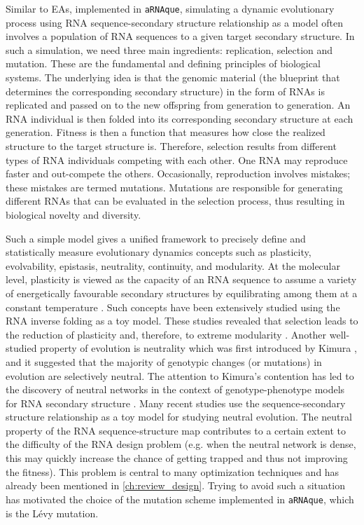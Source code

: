 Similar to \acp{EA}, implemented in \texttt{aRNAque}, simulating a dynamic evolutionary process using \ac{RNA} sequence-secondary structure relationship as a model often involves a population of \ac{RNA} sequences to a given target secondary structure. In such a simulation, we need three main ingredients: replication, selection and mutation. These are the fundamental and defining principles of biological systems. The underlying idea is that the genomic material (the blueprint that determines the corresponding secondary structure) in the form of \acp{RNA} is replicated and passed on to the new offspring from generation to generation. An \ac{RNA} individual is then folded into its corresponding secondary structure at each generation. Fitness is then a function that measures how close the realized structure to the target structure is. Therefore, selection results from different types of \ac{RNA} individuals competing with each other. One \ac{RNA} may reproduce faster and out-compete the others. Occasionally, reproduction involves mistakes; these mistakes are termed mutations. Mutations are responsible for generating different \acp{RNA} that can be evaluated in the selection process, thus resulting in biological novelty and diversity.  

Such a simple model gives a unified framework to precisely define and statistically measure evolutionary dynamics concepts such as plasticity, evolvability, epistasis, neutrality, continuity, and modularity. At the molecular level, plasticity is viewed as the capacity of an \ac{RNA} sequence to assume a variety of energetically favourable secondary structures by equilibrating among them at a constant temperature \cite{ancel2000plasticity}. Such concepts have been extensively studied using the \ac{RNA} inverse folding as a toy model. These studies revealed that selection leads to the reduction of plasticity and, therefore, to extreme modularity \cite{ancel2000plasticity}. Another well-studied property of evolution is neutrality which was first introduced by Kimura \cite{kimura1983neutral}, and it suggested that the majority of genotypic changes (or mutations) in evolution are selectively neutral. The attention to Kimura's contention has led to the discovery of neutral networks in the context of genotype-phenotype models for \ac{RNA} secondary structure \cite{schuster1994sequences,reidys1997generic}. Many recent studies \cite{smerlak2019effective, smerlak2021neutral} use the sequence-secondary structure relationship as a toy model for studying neutral evolution. The neutral property of the \ac{RNA} sequence-structure map contributes to a certain extent to the difficulty of the \ac{RNA} design problem (e.g. when the neutral network is dense, this may quickly increase the chance of getting trapped and thus not improving the fitness). This problem is central to many optimization techniques and has already been mentioned in \autoref{ch:review_design}. Trying to avoid such a situation has motivated the choice of the mutation scheme implemented in \texttt{aRNAque}, which is the Lévy mutation.

